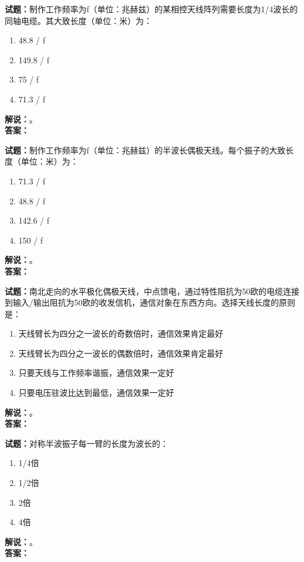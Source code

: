 \documentclass{ctexbook}
\begin{document}
\bigskip




\noindent\textbf{试题：}制作工作频率为f（单位：兆赫兹）的某相控天线阵列需要长度为1/4波长的同轴电缆。其大致长度（单位：米）为： 
\begin{enumerate}[leftmargin=3em]
\item 48.8 / f
\item 149.8 / f
\item 75 / f
\item 71.3 / f
\end{enumerate}
\noindent\textbf{解说：}\textbf{}。\\\noindent\textbf{答案：}

\bigskip




\noindent\textbf{试题：}制作工作频率为f（单位：兆赫兹）的半波长偶极天线。每个振子的大致长度（单位：米）为：
\begin{enumerate}[leftmargin=3em]
\item 71.3 / f
\item 48.8 / f
\item 142.6 / f
\item 150 / f
\end{enumerate}
\noindent\textbf{解说：}\textbf{}。\\\noindent\textbf{答案：}

\bigskip




\noindent\textbf{试题：}南北走向的水平极化偶极天线，中点馈电，通过特性阻抗为50欧的电缆连接到输入/输出阻抗为50欧的收发信机，通信对象在东西方向。选择天线长度的原则是：
\begin{enumerate}[leftmargin=3em]
\item 天线臂长为四分之一波长的奇数倍时，通信效果肯定最好
\item 天线臂长为四分之一波长的偶数倍时，通信效果肯定最好
\item 只要天线与工作频率谐振，通信效果一定好
\item 只要电压驻波比达到最低，通信效果一定好
\end{enumerate}
\noindent\textbf{解说：}\textbf{}。\\\noindent\textbf{答案：}

\bigskip




\noindent\textbf{试题：}对称半波振子每一臂的长度为波长的：
\begin{enumerate}[leftmargin=3em]
\item 1/4倍
\item 1/2倍
\item 2倍
\item 4倍
\end{enumerate}
\noindent\textbf{解说：}\textbf{}。\\\noindent\textbf{答案：}
\end{document}
